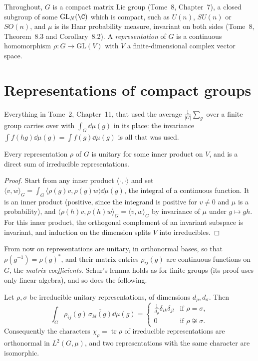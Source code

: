 Throughout, $G$ is a compact matrix Lie group (Tome~8, Chapter~7), a closed subgroup of some $\mathrm{GL}_N(\C)$ which is compact, such as $U(n)$, $SU(n)$ or $SO(n)$, and $\mu$ is its Haar probability measure, invariant on both sides (Tome~8, Theorem~8.3 and
Corollary~8.2). A \emph{representation} of $G$ is a continuous homomorphism $\rho:G\to\mathrm{GL}(V)$ with $V$ a finite-dimensional complex vector space.

\section{Representations of compact groups}

Everything in Tome~2, Chapter~11, that used the average $\frac1{|G|}\sum_g$ over a finite group carries over with $\int_G\dd\mu(g)$ in its place: the invariance $\int f(hg)\dd\mu(g)=\int f(g)\dd\mu(g)$ is all that was used.

\begin{proposition}\label{prop:unitarytrick}
Every representation $\rho$ of $G$ is unitary for some inner product on $V$, and is a direct sum of irreducible representations.
\end{proposition}

\begin{proof}
Start from any inner product $\langle\cdot,\cdot\rangle$ and set $\langle v,w\rangle_G=\int_G\langle\rho(g)v,\rho(g)w\rangle\dd\mu(g)$, the integral of a continuous function. It is an inner product (positive, since the integrand is positive for $v\ne0$ and $\mu$ is a
probability), and $\langle\rho(h)v,\rho(h)w\rangle_G=\langle v,w\rangle_G$ by invariance of $\mu$ under $g\mapsto gh$. For this inner product, the orthogonal complement of an invariant subspace is invariant, and induction on the dimension splits $V$ into irreducibles.
\end{proof}

From now on representations are unitary, in orthonormal bases, so that $\rho(g^{-1})=\rho(g)^*$, and their matrix entries $\rho_{ij}(g)$ are continuous functions on $G$, the \emph{matrix coefficients}. Schur's lemma holds as for finite groups (its proof uses only
linear algebra), and so does the following.

\begin{theorem}\label{thm:schurorth}
Let $\rho,\sigma$ be irreducible unitary representations, of dimensions $d_\rho,d_\sigma$. Then
\[
\int_G\rho_{ij}(g)\,\overline{\sigma_{kl}(g)}\dd\mu(g)=\begin{cases}\frac1{d_\rho}\delta_{ik}\delta_{jl}&\text{if }\rho=\sigma,\\0&\text{if }\rho\not\cong\sigma.\end{cases}
\]
Consequently the characters $\chi_\rho=\operatorname{tr}\rho$ of irreducible representations are orthonormal in $L^2(G,\mu)$, and two representations with the same character are isomorphic.
\end{theorem}

